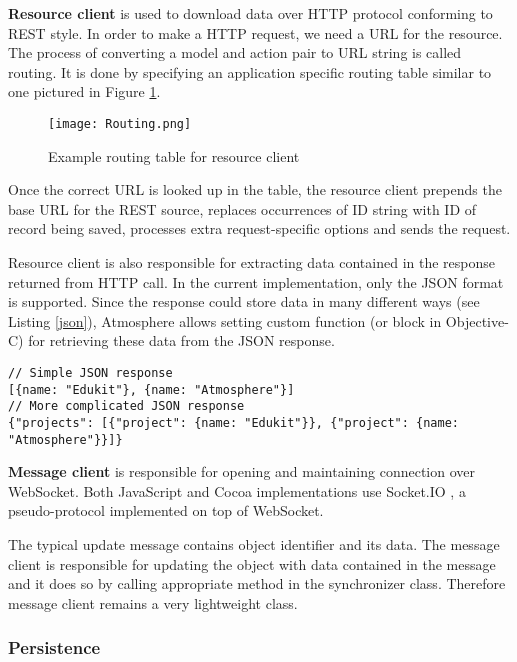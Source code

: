 \textbf{Resource client} is used to download data over HTTP protocol conforming to REST style. In order to make a HTTP request, we need a URL for the resource. The process of converting a model and action pair to URL string is called routing. It is done by specifying an application specific routing table similar to one pictured in Figure \ref{fig:Routing}.

\begin{figure}[htbp]
  \centering
    \texttt{[image: Routing.png]}
  \caption{Example routing table for resource client}
  \label{fig:Routing}
\end{figure}

Once the correct URL is looked up in the table, the resource client prepends the base URL for the REST source, replaces occurrences of ID string with ID of record being saved, processes extra request-specific options and sends the request.

Resource client is also responsible for extracting data contained in the response returned from HTTP call. In the current implementation, only the JSON format is supported. Since the response could store data in many different ways (see Listing \ref{json}), Atmosphere allows setting custom function (or block in Objective-C) for retrieving these data from the JSON response.

\begin{lstlisting}[caption=Different formats of response JSON data,label=json]
// Simple JSON response
[{name: "Edukit"}, {name: "Atmosphere"}]
// More complicated JSON response
{"projects": [{"project": {name: "Edukit"}}, {"project": {name: "Atmosphere"}}]}
\end{lstlisting}

\textbf{Message client} is responsible for opening and maintaining connection over WebSocket. Both JavaScript and Cocoa implementations use Socket.IO \citep{socketio}, a pseudo-protocol implemented on top of WebSocket.

The typical update message contains object identifier and its data. The message client is responsible for updating the object with data contained in the message and it does so by calling appropriate method in the synchronizer class. Therefore message client remains a very lightweight class.

\subsubsection{Persistence}

